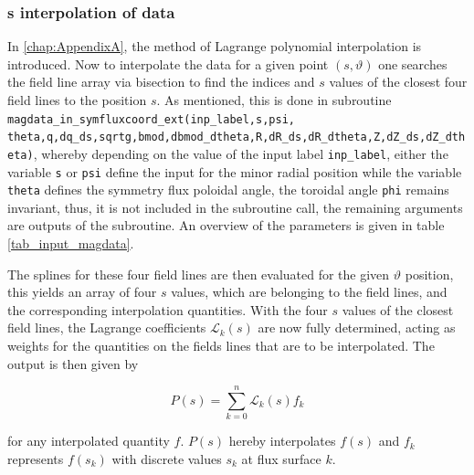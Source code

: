 \documentclass[./main.tex]{subfiles}
\begin{document}
\subsubsection{s interpolation of data}
In \autoref{chap:AppendixA}, the method of Lagrange polynomial interpolation is introduced. Now to interpolate the data for a given point $(s,\vartheta)$ one searches the field line array via bisection to find the indices and $s$ values of the closest four field lines to the position $s$. As mentioned, this is done in subroutine \texttt{magdata\_in\_symfluxcoord\_ext(inp\_label,s,psi,}\\
\texttt{theta,q,dq\_ds,sqrtg,bmod,dbmod\_dtheta,R,dR\_ds,dR\_dtheta,Z,dZ\_ds,dZ\_dth\\eta)}, whereby depending on the value of the input label \texttt{inp\_label}, either the variable \texttt{s} or \texttt{psi} define the input for the minor radial position while the variable \texttt{theta} defines the symmetry flux poloidal angle, the toroidal angle \texttt{phi} remains invariant, thus, it is not included in the subroutine call, the remaining arguments are outputs of the subroutine. An overview of the parameters is given in table \ref{tab_input_magdata}. 

The splines for these four field lines are then evaluated for the given $\vartheta$ position, this yields an array of four $s$ values, which are belonging to the field lines, and the corresponding interpolation quantities. With the four $s$ values of the closest field lines, the Lagrange coefficients $\mathscr{L}_k(s)$ are now fully determined, acting as weights for the quantities on the fields lines that are to be interpolated.
The output is then given by

\begin{equation*}
		P(s) = \sum_{k=0}^{n} \mathscr{L}_k(s)f_k
\end{equation*}

for any interpolated quantity $f$. $P(s)$ hereby interpolates $f(s)$ and $f_k$ represents $f(s_k)$ with discrete values $s_k$ at flux surface $k$.
\end{document}
